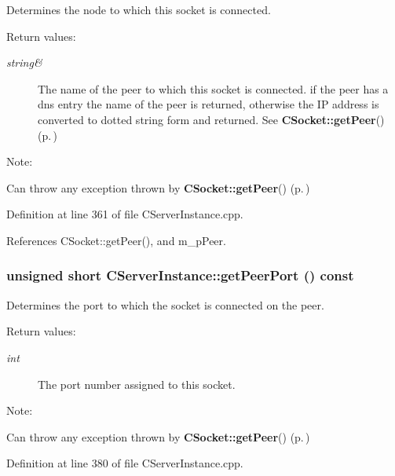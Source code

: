 Determines the node to which this socket is connected.\begin{Desc}
\item[Return values: ]\par
\begin{description}
\item[{\em 
string\&}]The name of the peer to which this socket is connected. if the peer has a dns entry the name of the peer is returned, otherwise the IP address is converted to dotted string form and returned. See {\bf CSocket::get\-Peer}() {\rm (p.\,\pageref{classCSocket_a13})}\end{description}
\end{Desc}
\begin{Desc}
\item[Note: ]\par
Can throw any exception thrown by {\bf CSocket::get\-Peer}() {\rm (p.\,\pageref{classCSocket_a13})} \end{Desc}


Definition at line 361 of file CServer\-Instance.cpp.

References CSocket::get\-Peer(), and m\_\-p\-Peer.
\subsubsection{\setlength{\rightskip}{0pt plus 5cm}unsigned short CServer\-Instance::get\-Peer\-Port () const}\label{classCServerInstance_a7}


Determines the port to which the socket is connected on the peer.\begin{Desc}
\item[Return values: ]\par
\begin{description}
\item[{\em 
int}]The port number assigned to this socket.\end{description}
\end{Desc}
\begin{Desc}
\item[Note: ]\par
Can throw any exception thrown by {\bf CSocket::get\-Peer}() {\rm (p.\,\pageref{classCSocket_a13})} \end{Desc}


Definition at line 380 of file CServer\-Instance.cpp.

